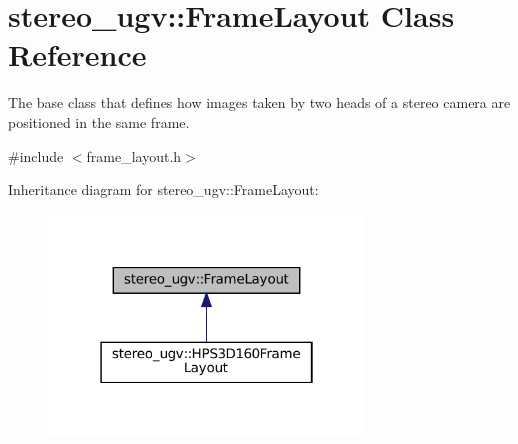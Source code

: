 \hypertarget{classstereo__ugv_1_1FrameLayout}{}\section{stereo\+\_\+ugv\+:\+:Frame\+Layout Class Reference}
\label{classstereo__ugv_1_1FrameLayout}


The base class that defines how images taken by two heads of a stereo camera are positioned in the same frame.  




{\ttfamily \#include $<$frame\+\_\+layout.\+h$>$}



Inheritance diagram for stereo\+\_\+ugv\+:\+:Frame\+Layout\+:
\nopagebreak
\begin{figure}[H]
\begin{center}
\leavevmode
\includegraphics[width=238pt]{classstereo__ugv_1_1FrameLayout__inherit__graph}
\end{center}
\end{figure}
